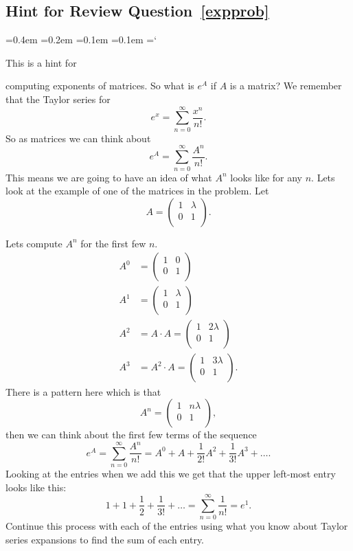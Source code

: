
\subsection*{Hint for Review Question~\ref{expprob}}

{\ttfamily
{}\font=0.4em
\font=0.2em
\font=0.1em
\font=0.1em
\hyphenchar\font=`\-

\hypertarget{properties_of_matrices_exponents}{This is a hint for} computing exponents of matrices. So what is $e^A$ if $A$ is a matrix? We remember that the Taylor series for
\[
e^x = \sum^{\infty}_{n=0} \frac{x^n}{n!}.
\]
So as matrices we can think about
\[
e^A = \sum^{\infty}_{n=0} \frac{A^n}{n!}.
\]
This means we are going to have an idea of what $A^n$ looks like for any $n$. Lets look at the example of one of the matrices in the problem. Let
\[
A = 
\left( 
\begin{array}{cc}
1 & \lambda\\
0 & 1\\
\end{array}
\right).
\]

Lets compute $A^n$ for the first few $n$. 
\begin{align*}
A^0 & =
\left(
\begin{array}{cc}
1 & 0\\
0 & 1\\
\end{array}
\right)
\\ A^1 & = 
\left(
\begin{array}{cc}
1 & \lambda \\
0 & 1\\
\end{array}
\right)
\\ A^2 & = A\cdot A = 
\left(
\begin{array}{cc}
1 & 2 \lambda \\
0 & 1\\
\end{array}
\right)
\\ A^3 & = A^2\cdot A = 
\left(
\begin{array}{cc}
1 & 3 \lambda \\
0 & 1\\
\end{array}
\right).
\end{align*}
There is a pattern here which is that 
\[ A^n = 
\left(
\begin{array}{cc}
1 & n \lambda \\
0 & 1\\
\end{array}
\right),
 \]
then we can think about the first few terms of the sequence
\[
e^A = \sum^{\infty}_{n=0} \frac{A^n}{n!} = A^0 + A + \frac{1}{2!} A^2 + \frac{1}{3!} A^3 + \ldots.
\]
Looking at the entries when we add this we get that the upper left-most entry looks like this:
\[
1 + 1 + \frac{1}{2} + \frac{1}{3!} + \ldots = \sum^{\infty}_{n=0} \frac{1}{n!} = e^1.
\]
Continue this process with each of the entries using what you know about Taylor series expansions to find the sum of each entry.
 
}
